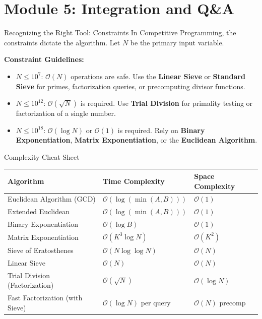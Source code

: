 \documentclass[aspectratio=169]{beamer}
\begin{document}
\section{Module 5: Integration and Q\&A}

\begin{frame}{Recognizing the Right Tool: Constraints}
    In Competitive Programming, the constraints dictate the algorithm. Let $N$ be the primary input variable.
    
    \vspace{0.3cm}
    \textbf{Constraint Guidelines:}
    \begin{itemize}
        \item $N \le 10^7$: $\mathcal{O}(N)$ operations are safe. Use the \textbf{Linear Sieve} or \textbf{Standard Sieve} for primes, factorization queries, or precomputing divisor functions.
        \item $N \le 10^{12}$: $\mathcal{O}(\sqrt{N})$ is required. Use \textbf{Trial Division} for primality testing or factorization of a single number.
        \item $N \le 10^{18}$: $\mathcal{O}(\log N)$ or $\mathcal{O}(1)$ is required. Rely on \textbf{Binary Exponentiation}, \textbf{Matrix Exponentiation}, or the \textbf{Euclidean Algorithm}.
    \end{itemize}
\end{frame}

\begin{frame}{Complexity Cheat Sheet}
    
    
    \vspace{0.2cm}
    \begin{table}[]
        \centering
        \begin{tabular}{|l|l|l|}
        \hline
        \textbf{Algorithm} & \textbf{Time Complexity} & \textbf{Space Complexity} \\ \hline
        Euclidean Algorithm (GCD) & $\mathcal{O}(\log(\min(A, B)))$ & $\mathcal{O}(1)$ \\ \hline
        Extended Euclidean & $\mathcal{O}(\log(\min(A, B)))$ & $\mathcal{O}(1)$ \\ \hline
        Binary Exponentiation & $\mathcal{O}(\log B)$ & $\mathcal{O}(1)$ \\ \hline
        Matrix Exponentiation & $\mathcal{O}(K^3 \log N)$ & $\mathcal{O}(K^2)$ \\ \hline
        Sieve of Eratosthenes & $\mathcal{O}(N \log \log N)$ & $\mathcal{O}(N)$ \\ \hline
        Linear Sieve & $\mathcal{O}(N)$ & $\mathcal{O}(N)$ \\ \hline
        Trial Division (Factorization) & $\mathcal{O}(\sqrt{N})$ & $\mathcal{O}(\log N)$ \\ \hline
        Fast Factorization (with Sieve) & $\mathcal{O}(\log N)$ per query & $\mathcal{O}(N)$ precomp \\ \hline
        \end{tabular}
    \end{table}
\end{frame}
\end{document}
